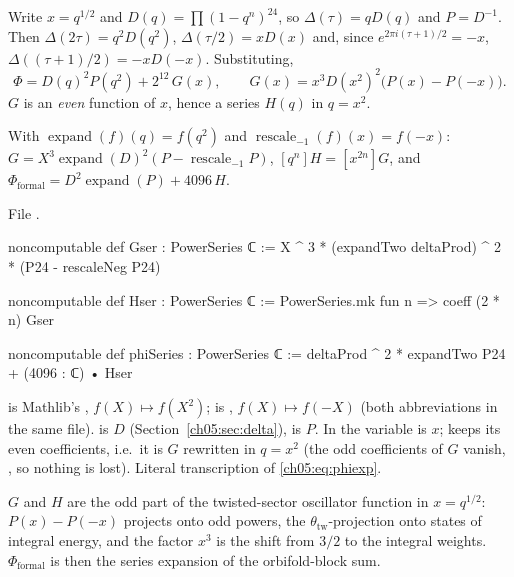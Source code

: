 Write $x = q^{1/2}$ and $D(q) = \prod(1-q^n)^{24}$, so $\Delta(\tau) = qD(q)$ and $P = D^{-1}$. Then
$\Delta(2\tau) = q^2D(q^2)$, $\Delta(\tau/2) = xD(x)$ and, since $e^{2\pi i(\tau+1)/2} = -x$, $\Delta((\tau+1)/2) =
-xD(-x)$. Substituting,
\begin{equation}\label{ch05:eq:phiexp}
  \Phi = D(q)^2P(q^2) + 2^{12}\,G(x),\qquad G(x) = x^3D(x^2)^2\bigl(P(x) - P(-x)\bigr).
\end{equation}
$G$ is an \emph{even} function of $x$, hence a series $H(q)$ in $q = x^2$.

\begin{definition}\label{ch05:def:phiseries}
With $\operatorname{expand}(f)(q) = f(q^2)$ and $\operatorname{rescale}_{-1}(f)(x) = f(-x)$:
$G = X^3\operatorname{expand}(D)^2(P - \operatorname{rescale}_{-1}P)$, $[q^n]H = [x^{2n}]G$, and
$\Phi_{\mathrm{formal}} = D^2\operatorname{expand}(P) + 4096\,H$.
\end{definition}
\noindent File .
\begin{leancode}
noncomputable def Gser : PowerSeries ℂ := X ^ 3 * (expandTwo deltaProd) ^ 2 * (P24 - rescaleNeg P24)

noncomputable def Hser : PowerSeries ℂ := PowerSeries.mk fun n => coeff (2 * n) Gser

noncomputable def phiSeries : PowerSeries ℂ := deltaProd ^ 2 * expandTwo P24 + (4096 : ℂ) • Hser
\end{leancode}
\begin{dictionary}
 is Mathlib's , $f(X)\mapsto f(X^2)$;  is
, $f(X)\mapsto f(-X)$ (both abbreviations in the same file).
 is $D$ (Section~\ref{ch05:sec:delta}),  is $P$. In  the variable is
$x$;  keeps its even coefficients, i.e.\ it is $G$ rewritten in $q = x^2$ (the odd
coefficients of $G$ vanish, , so nothing is lost). Literal transcription of
\eqref{ch05:eq:phiexp}.
\end{dictionary}

\begin{physics}
$G$ and $H$ are the odd part of the twisted-sector oscillator function in $x=q^{1/2}$: $P(x)-P(-x)$ projects onto odd powers, the $\theta_{\mathrm{tw}}$-projection onto states of integral energy, and the factor $x^3$ is the shift from $3/2$ to the integral weights. $\Phi_{\mathrm{formal}}$ is then the series expansion of the orbifold-block sum.
\end{physics}

